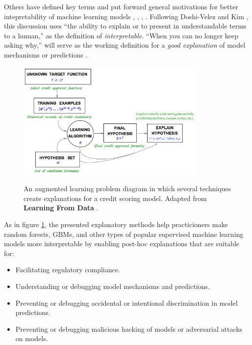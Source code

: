 \documentclass{article}
\begin{document}
Others have defined key terms and put forward general motivations for better intepretability of machine learning models \cite{lipton1}, \cite{been_kim1}, \cite{gilpin2018explaining}, \cite{guidotti2018survey}. Following Doshi-Velez and Kim , this discussion uses ``the ability to explain or to present in understandable terms to a human,'' as the definition of \textit{interpretable}. ``When you can no longer keep asking why,'' will serve as the working definition for a \textit{good explanation} of model mechanisms or predictions \cite{gilpin2018explaining}. 
	
\begin{figure}[htb]
	\begin{center}
		\includegraphics[height=165pt]{img/figure_1.png}
		\label{fig:learning_problem}
		\caption{An augmented learning problem diagram in which several techniques create explanations for a credit scoring model. Adapted from \textbf{Learning From Data} \cite{lfd}.}
	\end{center}
\end{figure}	
	
As in figure \ref{fig:learning_problem}, the presented explanatory methods help practicioners make random forests, GBMs, and other types of popular supervised  machine learning models more interpretable by enabling post-hoc explanations that are suitable for:\\

\begin{itemize}
	\item Facilitating regulatory compliance.
	\item Understanding or debugging model mechanisms and predictions.
	\item Preventing or debugging accidental or intentional discrimination in model predictions.
	\item Preventing or debugging malicious hacking of models or adversarial attacks on models.
\end{itemize}
\end{document}
